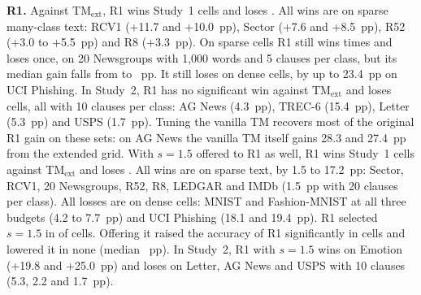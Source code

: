 \documentclass[preprint,12pt,times]{elsarticle}
\newcommand{\add}[1]{{\color{blue}#1}}
\begin{document}
\textbf{R1.} Against TM$_{\mathrm{ext}}$, R1 wins \ctlRextallW{} Study~1 cells and loses \ctlRextallL{}.
All wins are on sparse many-class text: RCV1 (+11.7 and +10.0~pp), Sector (+7.6 and +8.5~pp), R52 (+3.0 to +5.5~pp) and R8 (+3.3~pp).
On sparse cells R1 still wins \ctlRextsparseW{} times and loses once, on 20 Newsgroups with 1,000 words and 5 clauses per class, but its median gain falls from \ctlRorigsparseMed{} to \ctlRextsparseMed{}~pp.
It still loses on dense cells, by up to 23.4~pp on UCI Phishing.
In Study~2, R1 has no significant win against TM$_{\mathrm{ext}}$ and loses \ctlSRextallL{} cells, all with 10 clauses per class: AG News (4.3~pp), TREC-6 (15.4~pp), Letter (5.3~pp) and USPS (1.7~pp).
Tuning the vanilla TM recovers most of the original R1 gain on these sets: on AG News the vanilla TM itself gains 28.3 and 27.4~pp from the extended grid.
\add{With $s = 1.5$ offered to R1 as well, R1 wins \ctlRbothallW{} Study~1 cells against TM$_{\mathrm{ext}}$ and loses \ctlRbothallL{}.
All wins are on sparse text, by 1.5 to 17.2~pp: Sector, RCV1, 20 Newsgroups, R52, R8, LEDGAR and IMDb (1.5~pp with 20 clauses per class).
All losses are on dense cells: MNIST and Fashion-MNIST at all three budgets (4.2 to 7.7~pp) and UCI Phishing (18.1 and 19.4~pp).
R1 selected $s = 1.5$ in \selFiveROneSlow{} of \selFiveROneN{} cells. Offering it raised the accuracy of R1 significantly in \ctlRselfSW{} cells and lowered it in none (median \ctlRselfSMed{}~pp).
In Study~2, R1 with $s = 1.5$ wins on Emotion (+19.8 and +25.0~pp) and loses on Letter, AG News and USPS with 10 clauses (5.3, 2.2 and 1.7~pp).}
\end{document}
